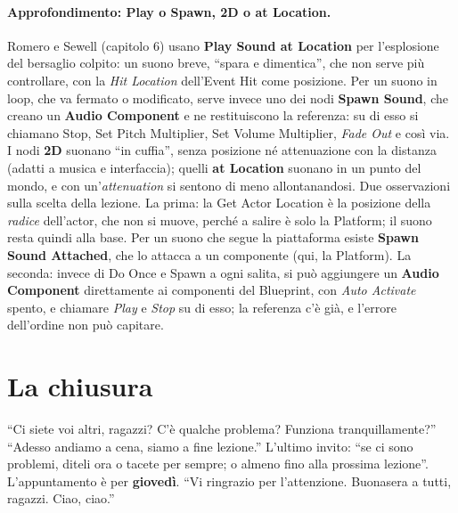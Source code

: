 \paragraph{Approfondimento: Play o Spawn, 2D o at Location.} Romero e Sewell (capitolo 6)
usano \textbf{Play Sound at Location} per l'esplosione del bersaglio colpito: un suono
breve, ``spara e dimentica'', che non serve più controllare, con la \emph{Hit Location}
dell'Event Hit come posizione. Per un suono in loop, che va fermato o modificato, serve
invece uno dei nodi \textbf{Spawn Sound}, che creano un \textbf{Audio Component} e ne
restituiscono la referenza: su di esso si chiamano Stop, Set Pitch Multiplier, Set Volume
Multiplier, \emph{Fade Out} e così via. I nodi \textbf{2D} suonano ``in cuffia'', senza
posizione né attenuazione con la distanza (adatti a musica e interfaccia); quelli
\textbf{at Location} suonano in un punto del mondo, e con un'\emph{attenuation} si
sentono di meno allontanandosi. Due osservazioni sulla scelta della lezione. La prima: la
Get Actor Location è la posizione della \emph{radice} dell'actor, che non si muove,
perché a salire è solo la Platform; il suono resta quindi alla base. Per un suono che
segue la piattaforma esiste \textbf{Spawn Sound Attached}, che lo attacca a un componente
(qui, la Platform). La seconda: invece di Do Once e Spawn a ogni salita, si può aggiungere
un \textbf{Audio Component} direttamente ai componenti del Blueprint, con \emph{Auto
Activate} spento, e chiamare \emph{Play} e \emph{Stop} su di esso; la referenza c'è già,
e l'errore dell'ordine non può capitare.

\section{La chiusura}
\label{ue6:sec:chiusura}

``Ci siete voi altri, ragazzi? C'è qualche problema? Funziona tranquillamente?'' ``Adesso
andiamo a cena, siamo a fine lezione.'' L'ultimo invito: ``se ci sono problemi, diteli
ora o tacete per sempre; o almeno fino alla prossima lezione''. L'appuntamento è per
\textbf{giovedì}. ``Vi ringrazio per l'attenzione. Buonasera a tutti, ragazzi. Ciao,
ciao.''

